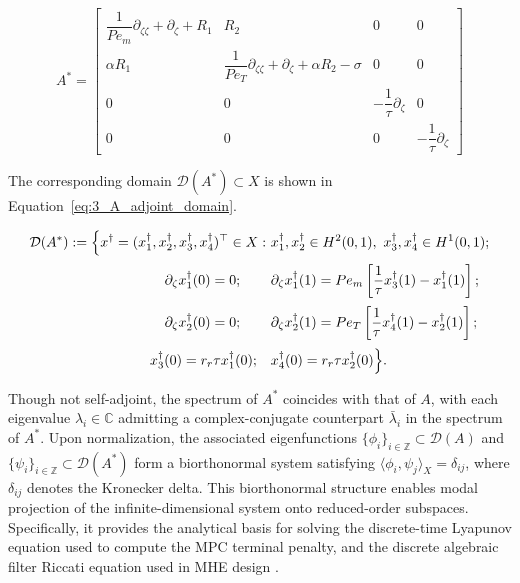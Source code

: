 \begin{equation} \label{eq:3_A_adjoint}
A^* =
\begin{bmatrix} 
\dfrac{1}{Pe_m} \partial_{\zeta \zeta} + \partial_\zeta + R_1 & R_2 & 0 & 0 \\
\alpha R_1 & \dfrac{1}{Pe_T} \partial_{\zeta \zeta} + \partial_\zeta + \alpha R_2 - \sigma & 0 & 0 \\
0 & 0 & -\dfrac{1}{\tau} \partial_\zeta & 0 \\
0 & 0 & 0 & -\dfrac{1}{\tau} \partial_\zeta
\end{bmatrix}
\end{equation}

The corresponding domain $\mathcal{D}(A^*) \subset X$ is shown in Equation~\eqref{eq:3_A_adjoint_domain}.

\begin{equation} \label{eq:3_A_adjoint_domain}
\begin{aligned}
\mathcal{D}(A^*) := \Big\{ x^\dagger = (x_1^\dagger, x_2^\dagger, x_3^\dagger, x_4^\dagger)^\top \in X :\ 
& x_1^\dagger, x_2^\dagger \in H^2(0,1),\ x_3^\dagger, x_4^\dagger \in H^1(0,1); \\[0.5ex]
\partial_\zeta x_1^\dagger(0) = 0; \hspace{2.2em} & \partial_\zeta x_1^\dagger(1) = Pe_m \left[ \frac{1}{\tau} x_3^\dagger(1) - x_1^\dagger(1) \right]; \\[0.5ex]
\partial_\zeta x_2^\dagger(0) = 0; \hspace{2.2em} & \partial_\zeta x_2^\dagger(1) = Pe_T \left[ \frac{1}{\tau} x_4^\dagger(1) - x_2^\dagger(1) \right]; \\[0.5ex]
x_3^\dagger(0) = r_r \tau x_1^\dagger(0); \quad & x_4^\dagger(0) = r_r \tau x_2^\dagger(0)
\Big\}.
\end{aligned}
\end{equation}


Though not self-adjoint, the spectrum of $A^*$ coincides with that of $A$, with each eigenvalue $\lambda_i \in \mathbb{C}$ admitting a complex-conjugate counterpart $\bar{\lambda}_i$ in the spectrum of $A^* $. Upon normalization, the associated eigenfunctions $\{ \phi_i \}_{i \in \mathbb{Z}} \subset \mathcal{D}(A)$ and $\{ \psi_i \}_{i \in \mathbb{Z}} \subset \mathcal{D}(A^*)$ form a biorthonormal system satisfying $\langle \phi_i, \psi_j \rangle_X = \delta_{ij}$, where $\delta_{ij}$ denotes the Kronecker delta. This biorthonormal structure enables modal projection of the infinite-dimensional system onto reduced-order subspaces. Specifically, it provides the analytical basis for solving the discrete-time Lyapunov equation used to compute the MPC terminal penalty, and the discrete algebraic filter Riccati equation used in MHE design \autocite{moadeli2025optimal, Khatibi2021Model, xie2022constrained}.

